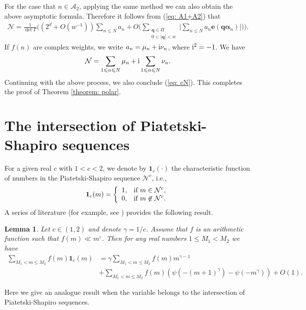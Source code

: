 \documentclass[12pt, reqno, twoside, letterpaper]{amsart}
\numberwithin{equation}{section}
\newcommand{\cN}{\ensuremath{\mathcal{N}}}
\theoremstyle{customthm}
\newtheorem{lemma}[X]{Lemma}
\theoremstyle{customrem}
\begin{document}
For the case that $n\in\mathcal{A}_2$,
applying the same method we can also obtain the above asymptotic formula. Therefore it follows from (\ref{eq: A1+A2}) that
\begin{align}\label{eq: cN}
	\cN = \frac{1}{\det \Gamma} \bigg( (2^d + O(w^{-1})) \sum_{n\leqslant N}a_n
	+ O\bigg( \sum_{\substack{\boldsymbol{q}\in\Pi \\ 0<|\boldsymbol{q}|<w}}
	\bigg| \sum_{n\leqslant N}a_n\mathbf{e}(\boldsymbol{q} \boldsymbol{\alpha}_n) \bigg| \bigg) \bigg).
\end{align}
If $f(n)$ are complex weights, we write $a_n=\mu_n+\textup{i}\nu_n$, where $\textup{i}^2=-1$. We have
$$
\mathcal{N}=\sum_{1\leqslant n\leqslant N}\mu_n+\textup{i}\sum_{1\leqslant n\leqslant N}\nu_n.
$$
Continuing with the above process, we also conclude (\ref{eq: cN}).
This completes the proof of Theorem \ref{theorem: polar}.


\section{The intersection of Piatetski-Shapiro sequences}
\label{section: Sums of an arithmetic function}


For a given real $c$ with $1<c<2$, we denote by $\mathbf{1}_{c}(\cdot)$ the characteristic
function of numbers in the Piatetski-Shapiro sequence $\mathcal{N}^c$, i.e.,
$$
\mathbf{1}_c(m)=\left\{\begin{array}{ll} 1,
& \hbox{if\ } m\in\mathcal{N}^c, \\
0, & \hbox{if\ } m\not\in\mathcal{N}^c.
\end{array}\right.
$$
A series of literature (for example, see \cite[Lemma 2]{BackerBBSW2013}) provides the following result.

\begin{lemma} \label{lemma: character of P-S}
Let $c\in(1,2)$ and denote $\gamma=1/c$. Assume that $f$ is an arithmetic
function such that $f(m)\ll m^{\varepsilon}$. Then for any real numbers $1\leqslant M_1<M_2$ we have
\begin{align*}
\sum_{M_1<m\leqslant M_2}f(m)\mathbf{1}_c(m)&
=\gamma\sum_{M_1<m\leqslant M_2}f(m)m^{\gamma-1}\\
&+\sum_{M_1<m\leqslant M_2}f(m)\left(\psi(-(m+1)^\gamma)-\psi(-m^{\gamma})\right)+O(1).
\end{align*}
\end{lemma}

Here we give an analogue result when the variable belongs to the intersection of
Piatetski-Shapiro sequences.
\end{document}
